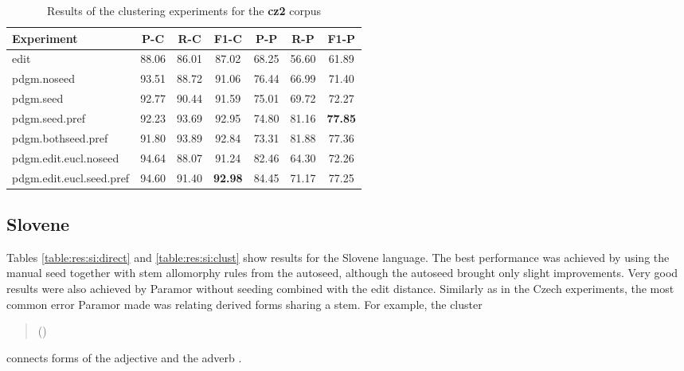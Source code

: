 \begin{table}[hp]
\begin{center}
\begin{tabular}{lcccccc}
\toprule
\bf Experiment & \bf P-C & \bf R-C & \bf F1-C & \bf P-P & \bf R-P & \bf F1-P\\
\midrule
edit & 88.06 & 86.01 & 87.02 & 68.25 & 56.60 & 61.89\\
pdgm.noseed & 93.51 & 88.72 & 91.06 & 76.44 & 66.99 & 71.40\\
pdgm.seed & 92.77 & 90.44 & 91.59 & 75.01 & 69.72 & 72.27\\
pdgm.seed.pref & 92.23 & 93.69 & 92.95 & 74.80 & 81.16 & \bf 77.85\\
pdgm.bothseed.pref & 91.80 & 93.89 & 92.84 & 73.31 & 81.88 & 77.36\\
pdgm.edit.eucl.noseed & 94.64 & 88.07 & 91.24 & 82.46 & 64.30 & 72.26\\
pdgm.edit.eucl.seed.pref & 94.60 & 91.40 & \bf 92.98 & 84.45 & 71.17 & 77.25\\
\bottomrule
\end{tabular}
\end{center}
\caption{\label{table:res:cz20:clust} Results of the clustering experiments for the \textbf{cz2} corpus}
\end{table}

\subsection{Slovene}
Tables \ref{table:res:si:direct} and \ref{table:res:si:clust} show results for the Slovene language. The best performance was achieved by using the manual seed together with stem allomorphy rules from the autoseed, although the autoseed brought only slight improvements. Very good results were also achieved by Paramor without seeding combined with the edit distance. Similarly as in the Czech experiments, the most common error Paramor made was relating derived forms sharing a stem. For example, the cluster 
\begin{quote}()
\end{quote}
 connects forms of the adjective  and the adverb .

